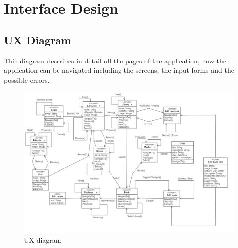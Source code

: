 \chapter{Interface Design}
\section{UX Diagram}
This diagram describes in detail all the pages of the application, how the application can
be navigated including the screens, the input forms and the possible errors.\\

\begin{figure}[!ht]
    \centering
	\includegraphics[scale=0.39]{images/ux-diagram.png}
	\caption{UX diagram}
	\label{fig:uxdiagram}
\end{figure}
\clearpage

